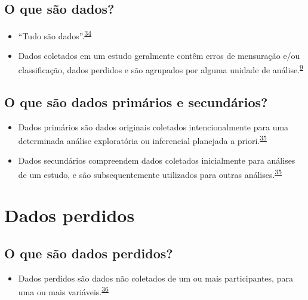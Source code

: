\documentclass[
  a4paper,
]{book}
\providecommand{\tightlist}{%
  \setlength{\itemsep}{0pt}\setlength{\parskip}{0pt}}
\begin{document}
\hypertarget{o-que-suxe3o-dados}{%
\subsection{O que são dados?}\label{o-que-suxe3o-dados}}

\begin{itemize}
\item
  ``Tudo são dados''.\textsuperscript{\protect\hyperlink{ref-Olson2021}{34}}
\item
  Dados coletados em um estudo geralmente contêm erros de mensuração e/ou classificação, dados perdidos e são agrupados por alguma unidade de análise.\textsuperscript{\protect\hyperlink{ref-van2022a}{9}}
\end{itemize}

\hypertarget{o-que-suxe3o-dados-primuxe1rios-e-secunduxe1rios}{%
\subsection{O que são dados primários e secundários?}\label{o-que-suxe3o-dados-primuxe1rios-e-secunduxe1rios}}

\begin{itemize}
\item
  Dados primários são dados originais coletados intencionalmente para uma determinada análise exploratória ou inferencial planejada a priori.\textsuperscript{\protect\hyperlink{ref-vetter2017}{35}}
\item
  Dados secundários compreendem dados coletados inicialmente para análises de um estudo, e são subsequentemente utilizados para outras análises.\textsuperscript{\protect\hyperlink{ref-vetter2017}{35}}
\end{itemize}

\hypertarget{dados-perdidos}{%
\section{Dados perdidos}\label{dados-perdidos}}

\hypertarget{o-que-suxe3o-dados-perdidos}{%
\subsection{O que são dados perdidos?}\label{o-que-suxe3o-dados-perdidos}}

\begin{itemize}
\tightlist
\item
  Dados perdidos são dados não coletados de um ou mais participantes, para uma ou mais variáveis.\textsuperscript{\protect\hyperlink{ref-Altman2007}{36}}
\end{itemize}
\end{document}
